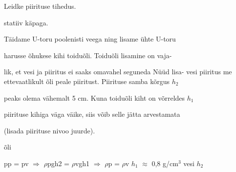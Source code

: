 
Leidke piirituse tihedus.

statiiv käpaga.

\hint

\solu
Täidame U-toru poolenisti veega ning lisame ühte U-toru

harusse õhukese kihi toiduõli. Toiduõli lisamine on vaja-

lik, et vesi ja piiritus ei saaks omavahel seguneda Nüüd lisa- vesi piiritus me ettevaatlikult õli peale piiritust. Piirituse samba kõrgus $h_2$

peaks olema vähemalt 5 cm. Kuna toiduõli kiht on võrreldes $h_1$

piirituse kihiga väga väike, siis võib selle jätta arvestamata

(lisada piirituse nivoo juurde).

õli

pp = pv $\Rightarrow$ $\rho$pgh2 = $\rho$vgh1 $\Rightarrow$ $\rho$p = $\rho$v $h_1$ $\approx$ 0,8 g/cm$^3$ vesi $h_2$
\probend
